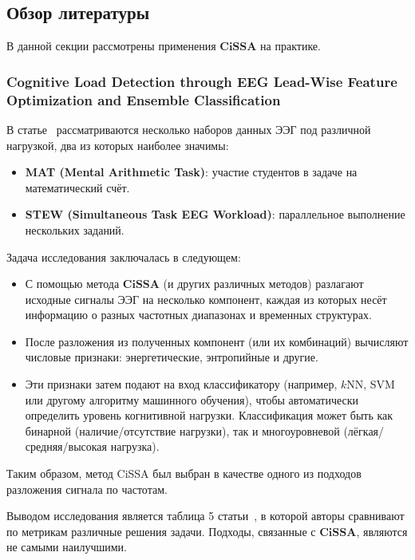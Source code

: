 \documentclass[a4paper, 11pt]{article}
\newcommand{\CISSA}{\textbf{CiSSA}}
\begin{document}
\subsection{Обзор литературы}


В данной секции рассмотрены применения $\CISSA$ на практике.

\subsubsection{Cognitive Load Detection through EEG Lead-Wise Feature Optimization and Ensemble Classification}

В статье~\cite{cognitive} рассматриваются несколько наборов данных ЭЭГ под различной нагрузкой, два из которых наиболее значимы:

\begin{itemize}
    \item \textbf{MAT (Mental Arithmetic Task)}: участие студентов в задаче на математический счёт.
    \item \textbf{STEW (Simultaneous Task EEG Workload)}: параллельное выполнение нескольких заданий.
\end{itemize}

Задача исследования заключалась в следующем:

\begin{itemize}
    \item С помощью метода $\CISSA$ (и других различных методов) разлагают исходные сигналы ЭЭГ на несколько компонент, каждая из которых несёт информацию о разных частотных диапазонах и временных структурах.
    \item После разложения из полученных компонент (или их комбинаций) вычисляют числовые признаки: энергетические, энтропийные и другие.
    \item Эти признаки затем подают на вход классификатору (например, $k$NN, SVM или другому алгоритму машинного обучения), чтобы автоматически определить уровень когнитивной нагрузки. Классификация может быть как бинарной (наличие/отсутствие нагрузки), так и многоуровневой (лёгкая/средняя/высокая нагрузка).
\end{itemize}

Таким образом, метод CiSSA был выбран в качестве одного из подходов разложения сигнала по частотам. 

Выводом исследования является таблица 5 статьи~\cite{cognitive}, в которой авторы сравнивают по метрикам различные решения задачи. Подходы, связанные с $\CISSA$, являются не самыми наилучшими.
\end{document}
